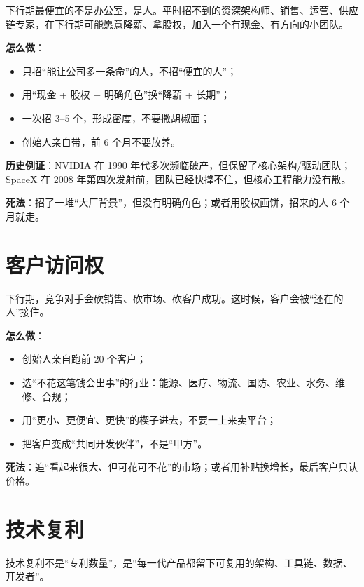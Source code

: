 下行期最便宜的不是办公室，是人。平时招不到的资深架构师、销售、运营、供应链专家，在下行期可能愿意降薪、拿股权，加入一个有现金、有方向的小团队。

\textbf{怎么做}：

\begin{itemize}
\tightlist
\item
  只招``能让公司多一条命''的人，不招``便宜的人''；
\item
  用``现金 + 股权 + 明确角色''换``降薪 + 长期''；
\item
  一次招 3--5 个，形成密度，不要撒胡椒面；
\item
  创始人亲自带，前 6 个月不要放养。
\end{itemize}

\textbf{历史例证}：NVIDIA 在 1990
年代多次濒临破产，但保留了核心架构/驱动团队；SpaceX 在 2008
年第四次发射前，团队已经快撑不住，但核心工程能力没有散。

\textbf{死法}：招了一堆``大厂背景''，但没有明确角色；或者用股权画饼，招来的人
6 个月就走。

\section{客户访问权}\label{ux5ba2ux6237ux8bbfux95eeux6743}

下行期，竞争对手会砍销售、砍市场、砍客户成功。这时候，客户会被``还在的人''接住。

\textbf{怎么做}：

\begin{itemize}
\tightlist
\item
  创始人亲自跑前 20 个客户；
\item
  选``不花这笔钱会出事''的行业：能源、医疗、物流、国防、农业、水务、维修、合规；
\item
  用``更小、更便宜、更快''的楔子进去，不要一上来卖平台；
\item
  把客户变成``共同开发伙伴''，不是``甲方''。
\end{itemize}

\textbf{死法}：追``看起来很大、但可花可不花''的市场；或者用补贴换增长，最后客户只认价格。

\section{技术复利}\label{ux6280ux672fux590dux5229}

技术复利不是``专利数量''，是``每一代产品都留下可复用的架构、工具链、数据、开发者''。

